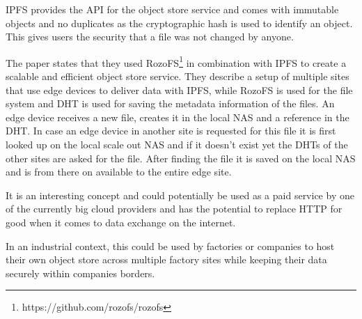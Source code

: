 IPFS provides the API for the object store service and comes with immutable objects and no duplicates as the cryptographic hash is used \cite{8014358} to identify an object. This gives users the security that a file was not changed by anyone.

The paper states that they used RozoFS\footnote{https://github.com/rozofs/rozofs} in combination with IPFS to create a scalable and efficient object store service.
They describe a setup of multiple sites that use edge devices to deliver data with IPFS, while RozoFS is used for the file system and DHT is used for saving the metadata information of the files. An edge device receives a new file, creates it in the local NAS and a reference in the DHT. In case an edge device in another site is requested for this file it is first looked up on the local scale out NAS and if it doesn’t exist yet the DHTs of the other sites are asked for the file. After finding the file it is saved on the local NAS and is from there on available to the entire edge site.

It is an interesting concept and could potentially be used as a paid service by one of the currently big cloud providers and has the potential to replace HTTP for good when it comes to data exchange on the internet.

In an industrial context, this could be used by factories or companies to host their own object store across multiple factory sites while keeping their data securely within companies borders.
